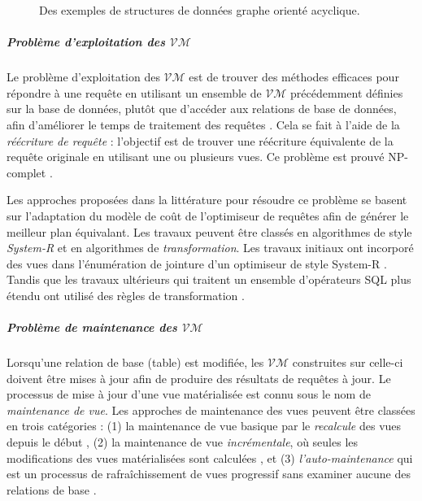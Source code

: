 \begin{figure}
  \centering
  \quad
  \quad
  \caption{Des exemples de structures de données graphe orienté acyclique.}\label{fig:dag-examples}
\end{figure}

\subparagraph{Problème d'exploitation des $\mathcal{VM}$}
Le problème d'exploitation des $\mathcal{VM}$ est de trouver des méthodes efficaces pour répondre à une requête en utilisant un ensemble de $\mathcal{VM}$ précédemment définies sur la base de données, plutôt que d'accéder aux relations de base de données, afin d'améliorer le temps de traitement des requêtes \cite{Halevy01}. Cela se fait à l'aide de la \textit{réécriture de requête} : l'objectif est de trouver une réécriture équivalente de la requête originale en utilisant une ou plusieurs vues. Ce problème est prouvé NP-complet \cite{Levy95}.

Les approches proposées dans la littérature pour résoudre ce problème se basent sur l'adaptation du modèle de coût de l'optimiseur de requêtes afin de générer le meilleur plan équivalant. Les travaux peuvent être classés en algorithmes de style \textit{System-R} et en algorithmes de \textit{transformation}. Les travaux initiaux ont incorporé des vues dans l'énumération de jointure d'un optimiseur de style System-R \cite{Chaudhuri95,Levy95}. Tandis que les travaux ultérieurs qui traitent un ensemble d'opérateurs SQL plus étendu ont utilisé des règles de transformation \cite{Goldstein01,Zaharioudakis00}.

\subparagraph{Problème de maintenance des $\mathcal{VM}$}
Lorsqu'une relation de base (table) est modifiée, les $\mathcal{VM}$ construites sur celle-ci doivent être mises à jour afin de produire des résultats de requêtes à jour. Le processus de mise à jour d'une vue matérialisée est connu sous le nom de \textit{maintenance de vue}. Les approches de maintenance des vues peuvent être classées en trois catégories : (1) la maintenance de vue basique par le \textit{recalcule} des vues depuis le début \cite{Gupta95}, (2) la maintenance de vue \textit{incrémentale}, où seules les modifications des vues matérialisées sont calculées \cite{Mohania97}, et (3) \textit{l'auto-maintenance} qui est un processus de rafraîchissement de vues progressif sans examiner aucune des relations de base \cite{Gupta95b}.

